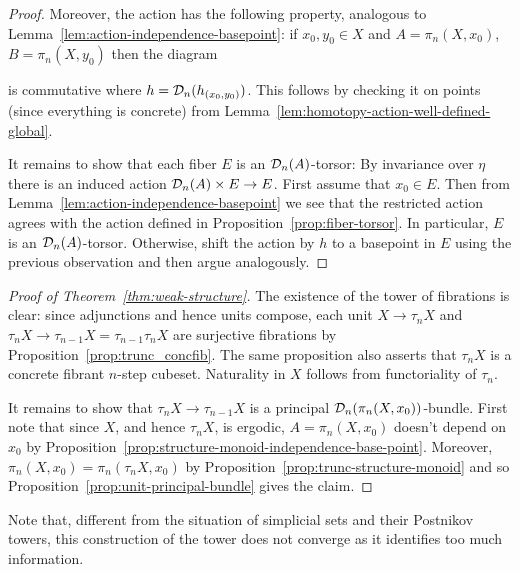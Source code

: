 \begin{proof}
Moreover, the action has the following property, analogous to Lemma~\ref{lem:action-independence-basepoint}:
if $x_0,y_0\in X$ and $A = \pi_n(X,x_0)$, $B = \pi_n(X,y_0)$ then the diagram
\begin{center}
\end{center}
is commutative where $h = \mathcal{D}_n(h_{(x_0,y_0)})$.
This follows by checking it on points (since everything is concrete) from Lemma~\ref{lem:homotopy-action-well-defined-global}.

It remains to show that each fiber $E$ is an $\mathcal{D}_n(A)$-torsor:
By invariance over $\eta$ there is an induced action $\mathcal{D}_n(A)\times E\to E$.
First assume that $x_0\in E$.
Then from Lemma~\ref{lem:action-independence-basepoint} we see that
the restricted action agrees with the action defined in Proposition~\ref{prop:fiber-torsor}.
In particular, $E$ is an $\mathcal{D}_n(A)$-torsor.
Otherwise, shift the action by $h$ to a basepoint in $E$ using the previous observation
and then argue analogously.
\end{proof}

\begin{proof}[Proof of Theorem~\ref{thm:weak-structure}]
The existence of the tower of fibrations is clear:
since adjunctions and hence units compose, each unit $X\to\tau_n X$ and $\tau_n X\to\tau_{n-1} X = \tau_{n-1}\tau_n X$
are surjective fibrations by Proposition~\ref{prop:trunc_concfib}.
The same proposition also asserts that $\tau_n X$ is a concrete fibrant $n$-step cubeset.
Naturality in $X$ follows from functoriality of $\tau_n$.

It remains to show that $\tau_n X\to\tau_{n-1} X$ is a principal $\mathcal{D}_n(\pi_n(X,x_0))$-bundle.
First note that since $X$, and hence $\tau_n X$, is ergodic, $A = \pi_n(X,x_0)$ doesn't depend on $x_0$
by Proposition~\ref{prop:structure-monoid-independence-base-point}.
Moreover, $\pi_n(X,x_0) = \pi_n(\tau_n X,x_0)$ by Proposition~\ref{prop:trunc-structure-monoid}
and so Proposition~\ref{prop:unit-principal-bundle} gives the claim.
\end{proof}

Note that, different from the situation of simplicial sets and their Postnikov towers,
this construction of the tower does not converge as it identifies too much information.

